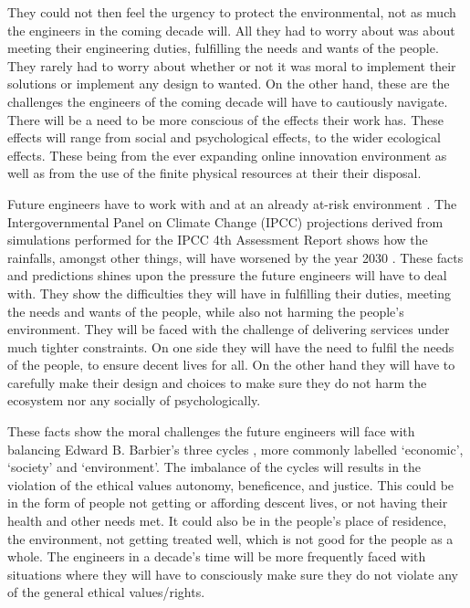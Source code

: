\documentclass[12pt]{witseiepaper}
\begin{document}
    They could not then feel the urgency to protect the environmental, not as much the engineers in the coming decade will. All they had to worry about was about meeting their engineering duties, fulfilling the needs and wants of the people. They rarely had to worry about whether or not it was moral to implement their solutions or implement any design to wanted. On the other hand, these are the challenges the engineers of the coming decade will have to cautiously navigate. There will be a need to be more conscious of the effects their work has. These effects will range from social and psychological effects, to the wider ecological effects. These being from the ever expanding online innovation environment as well as from the use of the finite physical resources at their their disposal. 
    
    Future engineers have to work with and at an already at-risk environment \cite{macnaghten2006risk}. The Intergovernmental Panel on Climate Change (IPCC) projections derived from simulations performed for the IPCC 4th Assessment Report shows how the rainfalls, amongst other things, will have worsened by the year 2030 \cite{suppiah2007australian}. These facts and predictions shines upon the pressure the future engineers will have to deal with. They show the difficulties they will have in fulfilling their duties, meeting the needs and wants of the people, while also not harming the people's environment. They will be faced with the challenge of delivering services under much tighter constraints.
    On one side they will have the need to fulfil the needs of the people, to ensure decent lives for all. On the other hand they will have to carefully make their design and choices to make sure they do not harm the ecosystem nor any socially of psychologically. 
    
    These facts show the moral challenges the future engineers will face with balancing Edward B. Barbier’s three cycles \cite{barbier1987concept}, more commonly labelled ‘economic’, ‘society’ and ‘environment’. The imbalance of the cycles will results in the violation of the ethical values autonomy, beneficence, and justice. This could be in the form of people not getting or affording descent lives, or not having their health and other needs met. It could also be in the people’s place of residence, the environment, not getting treated well, which is not good for the people as a whole. The engineers in a decade’s time will be more frequently faced with situations where they will have to consciously make sure they do not violate any of the general ethical values/rights. 
\end{document}

